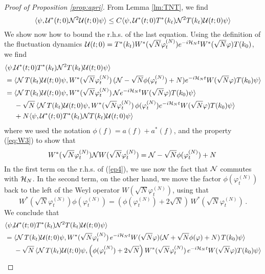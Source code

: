 \documentclass[11pt,a4paper,DIV11]{scrartcl}	%
\newcommand{\cU}{{\cal U}}
\newcommand{\cH}{{\cal H}}
\newcommand{\cN}{{\cal N}}
\newcommand{\N}{\mathcal{N}}
\begin{document}
\begin{proof}[Proof of Proposition \ref{prop:apri}]
{F}rom Lemma \ref{lm:TNT}, we find
\begin{equation}\label{ep4-0}   \langle \psi , \cU^* (t;0) \cN^2 \cU (t;0) \psi \rangle \leq C  \langle \psi , \cU^* (t;0) T^* (k_t) \cN^2 T (k_t) \cU (t;0) \psi \rangle \end{equation}
We show now how to bound the r.h.s. of the last equation. Using the definition of the fluctuation dynamics $\cU (t;0) = T^* (k_t) W^* (\sqrt{N} \varphi_t^{(N)}) e^{-i\cH_N t} W^* (\sqrt{N} \varphi) T (k_0)$, we find 
\begin{equation}\label{ep4}
\begin{split}
\langle \psi, &\cU^* (t;0) T^* (k_t) \N^2 T (k_t) \cU (t;0) \psi \rangle 
     \\  = \; & \langle \cN \, T (k_t) \cU (t;0) \psi,  W^* (\sqrt{N} \varphi_t^{(N)}) \, (\cN - \sqrt{N} \phi (\varphi_t^{(N)}) + N) e^{-i\cH_N t}  W (\sqrt{N} \varphi) T (k_0) \psi \rangle \\
      = \; & \langle \cN \, T (k_t) \cU (t;0) \psi,  W^* (\sqrt{N} \varphi_t^{(N)}) \,  \cN e^{-i \cH_N t}
      W (\sqrt{N} \varphi) T (k_0) \psi \rangle \\ & - \sqrt{N} \, \langle \cN \, T (k_t) \cU (t;0) \psi,  W^* (\sqrt{N} \varphi_t^{(N)} )\, \phi (\varphi_t^{(N)}) e^{-i \cH_N t}  W (\sqrt{N} \varphi) T (k_0) \psi \rangle \\
      &+  N  \langle \psi,\cU^* (t;0) T^* (k_t) \cN T (k_t) \cU (t;0) \psi \rangle 
      \end{split} \end{equation}
where we used the notation $\phi (f) = a( f) + a^* (f)$, and the property (\ref{eq:W3}) to show that 
\[ W^* (\sqrt{N} \varphi_t^{(N)}) \cN W (\sqrt{N} \varphi_t^{(N)}) = \cN - \sqrt{N} \phi (\varphi_t^{(N)})  +N \,  \]      
In the first term on the r.h.s. of (\ref{ep4}), we use now the fact that $\cN$ commutes with $\cH_N$. In the second term, on the other hand, we move the factor $\phi (\varphi_t^{(N)})$ back to the left of the Weyl operator $W (\sqrt{N} \varphi_t^{(N)})$, using that \[ W^* (\sqrt{N} \varphi_t^{(N)}) \phi (\varphi_t^{(N)}) = \left(\phi (\varphi_t^{(N)}) + 2 \sqrt{N} \right) \, W^* (\sqrt{N} \varphi_t^{(N)})\,. \] We conclude that
\begin{equation}\begin{split}
\langle \psi , &\cU^* (t;0) T^* (k_t) \cN^2 T(k_t) \cU (t;0) \psi \rangle \\ = \; & \langle \cN \, T (k_t) \cU (t;0) \psi,  W^* (\sqrt{N} \varphi_t^{(N)}) \,  e^{-i \cH_N t} W (\sqrt{N} \varphi) (\cN + \sqrt{N} \phi (\varphi) + N) \, T (k_0) \psi \rangle \\ &-  \sqrt{N} \, \langle \cN \, T (k_t) \cU (t;0) \psi,  \left(\phi (\varphi_t^{(N)}) + 2\sqrt{N} \right)  W^* (\sqrt{N} \varphi_t^{(N)}) \, e^{-i \cH_N t}  W (\sqrt{N} \varphi) T (k_0) \psi \rangle \\

\end{split}
\end{equation}
\end{proof}
\end{document}
